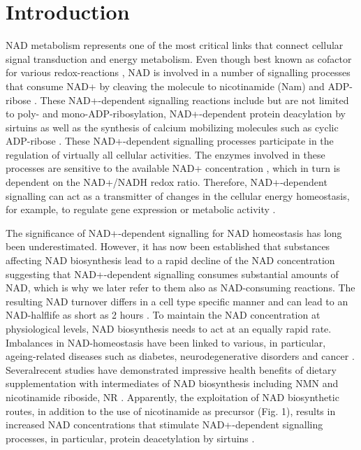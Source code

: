 
\section{Introduction}

NAD metabolism represents one of the most critical links that connect cellular signal transduction and energy metabolism. Even though best known as cofactor for various redox-reactions , NAD is involved in a number of signalling processes that consume NAD+ by cleaving the molecule to nicotinamide (Nam) and ADP-ribose \cite{Verdin2015}. These NAD+-dependent signalling reactions include but are not limited to poly- and mono-ADP-ribosylation, NAD+-dependent protein deacylation by sirtuins as well as the synthesis of calcium mobilizing molecules such as cyclic ADP-ribose \cite{Opitz2015}. These NAD+-dependent signalling processes participate in the regulation of virtually all cellular activities. The enzymes involved in these processes are sensitive to the available NAD+ concentration \cite{Ruggieri2015}, which in turn is dependent on the NAD+/NADH redox ratio. Therefore, NAD+-dependent signalling can act as a transmitter of changes in the cellular energy homeostasis, for example, to regulate gene expression or metabolic activity \cite{Koch-Nolte2009}.

The significance of NAD+-dependent signalling for NAD homeostasis has long been underestimated. However, it has now been established that substances affecting NAD biosynthesis lead to a rapid decline of the NAD concentration \cite{Vacor2018} suggesting that NAD+-dependent signalling consumes substantial amounts of NAD, which is why we later refer to them also as NAD-consuming reactions. The resulting NAD turnover differs in a cell type specific manner and can lead to an NAD-halflife as short as 2 hours \cite{Rabinowitz2018}. To maintain the NAD concentration at physiological levels, NAD biosynthesis needs to act at an equally rapid rate. Imbalances in NAD-homeostasis have been linked to various, in particular, ageing-related diseases such as diabetes, neurodegenerative disorders and cancer \cite{Chiarugi2012,Verdin2015}. Severalrecent studies have demonstrated impressive health benefits of dietary supplementation with intermediates of NAD biosynthesis including NMN and nicotinamide riboside, NR \cite{ImaiCellmetab2018}. Apparently, the exploitation of NAD biosynthetic routes, in addition to the use of nicotinamide as precursor (Fig. 1), results in increased NAD concentrations that stimulate NAD+-dependent signalling processes, in particular, protein deacetylation by sirtuins .

